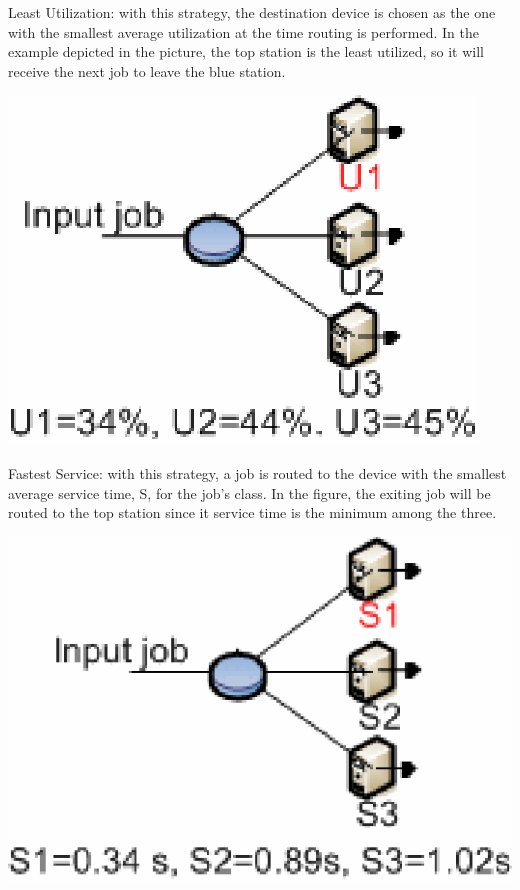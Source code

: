 \begin{description*}
\begin{center}
\end{center}
\item[Least Utilization:] with this strategy, the destination device is chosen as the one with the smallest average utilization at the time routing is performed. In the example depicted in the picture, the top station is the least utilized, so it will receive the next job to leave the blue station.
\begin{center}
\includegraphics[scale=.5]{img/jsim/utilization.eps}
\end{center}
\item[Fastest Service:] with this strategy, a job is routed to the device with the smallest average service time, S, for the job's class. In the figure, the exiting job will be routed to the top station since it service time is the minimum among the three.
\begin{center}
\includegraphics[scale=.5]{img/jsim/S_time.eps}
\end{center}
\end{description*}

